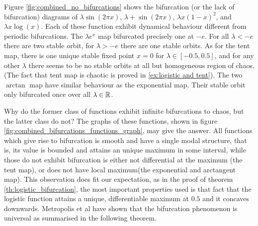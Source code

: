 Figure \ref{fig:combined_no_bifurcations} shows the bifurcation (or the lack of bifurcation) diagrams of $\lambda \sin(2\pi x)$, $\lambda + \sin(2\pi x)$, $\lambda x(1-x)^2$, and $\lambda x \log(x)$. 
Each of these function exhibit dynamical behaviour different from periodic bifurcations.
The $\lambda e^x$ map bifurcated precisely one at $-e$. 
For all $\lambda < -e$ there are two stable orbit, for $\lambda > -e$ there are one stable orbits.
As for the tent map, there is one unique stable fixed point $x=0$ for $\lambda \in [-0.5, 0.5]$, and for any other $\lambda$ there seems to be no stable orbits at all but homogeneous region of chaos. 
(The fact that tent map is chaotic is proved in \ref{ex:logistic and tent}).
The two $\arctan$ map have similar behaviour as the exponential map. 
Their stable orbit only bifurcated once over all $\lambda \in \mathbb{R}$.

Why do the former class of functions exhibit infinite bifurcations to chaos, but the latter class do not?
The graphs of these functions, shown in figure \ref{fig:combined_bifurcations_functions_graph}, may give the answer. 
All functions which give rise to bifurcation is smooth and have a single modal structure, that is, its value is bounded and attains an unique maximum in some interval, while those do not exhibit bifurcation is either not differential at the maximum (the tent map), or does not have local maximum(the exponential and arctangent map).
This observation does fit our expectation, as in the proof of theorem \ref{th:logistic_bifurcation}, the most important properties used is that fact that the logistic function attains a unique, differentiable maximum at $0.5$ and it concaves downwards. 
Metropolis et al \cite{metropolis2017finite} have shown that the bifurcation phenomenon is universal as summarised in the following theorem.

